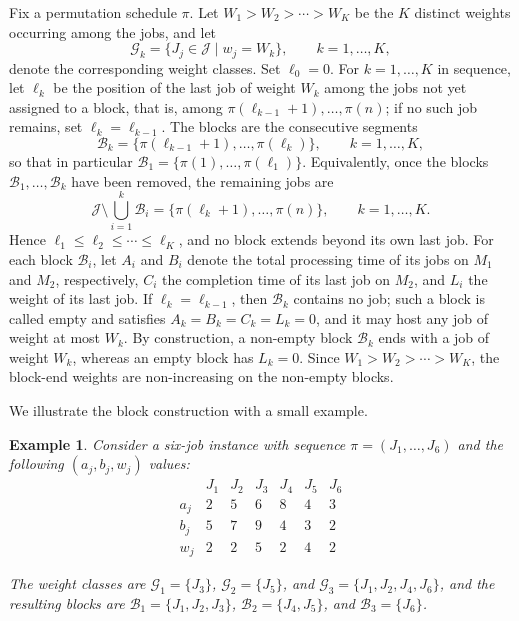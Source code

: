 ﻿\documentclass[12pt]{article}
\newtheorem{exam}{Example}[section]
\begin{document}
\begin{sloppypar}
Fix a permutation schedule $\pi$. Let $W_1 > W_2 > \cdots > W_K$ be the $K$ distinct weights
occurring among the jobs, and let
\[
\mathcal{G}_k = \{J_j \in \mathcal{J} \mid w_j = W_k\}, \qquad k = 1,\dots,K,
\]
denote the corresponding weight classes. Set $\ell_0 = 0$. For $k = 1,\dots,K$ in sequence, let
$\ell_k$ be the position of the last job of weight $W_k$ among the jobs not yet assigned to a block,
that is, among $\pi(\ell_{k-1}+1),\dots,\pi(n)$; if no such job remains, set $\ell_k = \ell_{k-1}$.
The blocks are the consecutive segments
\[
\mathcal{B}_k = \{\pi(\ell_{k-1}+1), \dots, \pi(\ell_k)\}, \qquad k = 1,\dots,K,
\]
so that in particular $\mathcal{B}_1 = \{\pi(1),\dots,\pi(\ell_1)\}$. Equivalently, once the blocks
$\mathcal{B}_1,\dots,\mathcal{B}_k$ have been removed, the remaining jobs are
\[
\mathcal{J}\setminus\bigcup_{i=1}^{k}\mathcal{B}_i = \{\pi(\ell_k+1),\dots,\pi(n)\}, \qquad k=1,\dots,K .
\]
Hence $\ell_1\le\ell_2\le\cdots\le\ell_K$, and no block extends beyond its own last job.
For each block $\mathcal{B}_i$, let $A_i$ and $B_i$ denote the total processing time of its jobs on
$M_1$ and $M_2$, respectively, $C_i$ the completion time of its last job on $M_2$, and $L_i$ the
weight of its last job. If $\ell_k = \ell_{k-1}$, then $\mathcal{B}_k$ contains no job; such a block
is called empty and satisfies $A_k = B_k = C_k = L_k = 0$, and it may host any job of weight at most
$W_k$. By construction, a non-empty block $\mathcal{B}_k$ ends with a job of weight $W_k$, whereas an
empty block has $L_k = 0$. Since $W_1 > W_2 > \cdots > W_K$, the block-end weights are non-increasing
on the non-empty blocks.

We illustrate the block construction with a small example.
\begin{exam}\label{ex:blocking}
Consider a six-job instance with sequence $\pi = (J_1, \dots, J_6)$ and the following $(a_j,b_j,w_j)$ values:
\[
\begin{array}{c|cccccc}
      & J_1 & J_2 & J_3 & J_4 & J_5 & J_6 \\
\hline
a_j &  2  &  5  &  6  &  8  &  4  &  3  \\
b_j &  5  &  7  &  9  &  4  &  3  &  2  \\
w_j &  2  &  2  &  5  &  2  &  4  &  2
\end{array}
\]

The weight classes are $\mathcal{G}_1=\{J_3\}$, $\mathcal{G}_2=\{J_5\}$, and
$\mathcal{G}_3=\{J_1,J_2,J_4,J_6\}$, and the resulting blocks are $\mathcal{B}_1=\{J_1,J_2,J_3\}$,
$\mathcal{B}_2=\{J_4,J_5\}$, and $\mathcal{B}_3=\{J_6\}$.
\end{exam}


\end{sloppypar}
\end{document}
